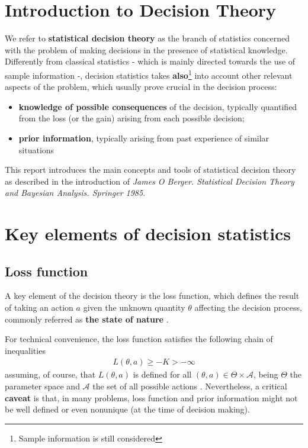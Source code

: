 \documentclass{article}
\newcommand{\loss}{L(\theta, a)}
\begin{document}
	
	
	\section{Introduction to Decision Theory}
	We refer to \textbf{statistical decision theory} as the branch of statistics concerned with the problem of making decisions in the presence of statistical knowledge.
	Differently from classical statistics - which is mainly directed towards the use of sample information -, decision statistics takes \textbf{also}\footnote{Sample information is still considered} into account other relevant aspects of the problem, which usually prove crucial in the decision process:
	\begin{itemize}
		\item \textbf{knowledge of possible consequences} of the decision, typically quantified from the loss (or the gain) arising from each possible decision;
		\item \textbf{prior information}, typically arising from past experience of similar situations
	\end{itemize}
	This report introduces the main concepts and tools of statistical decision theory as described in the introduction of \textit{James O Berger. Statistical Decision Theory and Bayesian 
	Analysis. Springer 1985}.
	
	\section{Key elements of decision statistics}
	\subsection{Loss function}
		A key element of the decision theory is the loss function, which defines the result of taking an action $a$ given the unknown quantity $\theta$ affecting the decision process, commonly 
	referred as \textbf{the state of nature} . 
	
	For technical convenience, the loss function satisfies the following chain of inequalities
	\begin{align*}
		\loss \ge -K > - \infty
	\end{align*} 
	assuming, of course, that $\loss$ is defined for all $(\theta, a) \in \Theta \times \mathcal{A}$, being $\Theta$ the parameter space and $\mathcal{A}$ the set of all possible actions . Nevertheless, a critical \textbf{caveat} is that, in many problems, loss function and prior information might not be well defined or even nonunique (at the time of decision making).
	 
\end{document}
